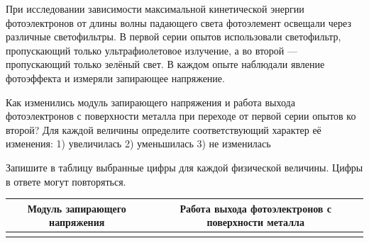 
\begin{taskbasic}[code={\label{task:photo_uv_to_green_u_and_work}}]
При исследовании зависимости максимальной кинетической энергии фотоэлектронов от длины волны падающего света фотоэлемент освещали через различные светофильтры. В первой серии опытов использовали светофильтр, пропускающий только ультрафиолетовое излучение, а во второй --- пропускающий только зелёный свет. В каждом опыте наблюдали явление фотоэффекта и измеряли запирающее напряжение.

Как изменились модуль запирающего напряжения и работа выхода фотоэлектронов с поверхности металла при переходе от первой серии опытов ко второй? Для каждой величины определите соответствующий характер её изменения:
1) увеличилась
2) уменьшилась
3) не изменилась

Запишите в таблицу выбранные цифры для каждой физической величины. Цифры в ответе могут повторяться.

\nopagebreak\smallskip
\begin{center}
\small
\begin{tabular}{|c|c|}
\hline
Модуль запирающего напряжения & Работа выхода фотоэлектронов с поверхности металла \\ \hline
 & \\ \hline
\end{tabular}
\end{center}

\end{taskbasic}


